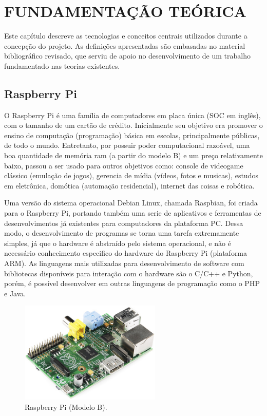 
\chapter{FUNDAMENTAÇÃO TEÓRICA}
\label{chap:fundamentacao-teorica}

Este capítulo descreve as tecnologias e conceitos centrais utilizados durante a
concepção do projeto. As definições apresentadas são embasadas no material bibliográfico
revisado, que serviu de apoio no desenvolvimento de um trabalho fundamentado nas teorias
existentes.

\section{Raspberry Pi}
\label{sec:raspi}

O Raspberry Pi é uma família de computadores em placa única (SOC em inglês), com o tamanho de um cartão de crédito. Inicialmente seu objetivo era promover o ensino de computação (programação) básica em escolas, principalmente públicas, de todo o mundo. Entretanto, por possuir poder computacional razoável, uma boa quantidade de memória ram (a partir do modelo B) e um preço relativamente baixo, passou a ser usado para outros objetivos como: console de videogame clássico (emulação de jogos), gerencia de mídia (vídeos, fotos e musicas), estudos em eletrônica, domótica (automação residencial), internet das coisas e robótica.  \par
Uma versão do sistema operacional Debian Linux, chamada Raspbian, foi criada para o Raspberry Pi, portando também uma serie de aplicativos e ferramentas de desenvolvimentos já existentes para computadores da plataforma PC. Dessa modo, o desenvolvimento de programas se torna uma tarefa extremamente simples, já que o hardware é abstraído pelo sistema operacional, e não é necessário conhecimento especifico do hardware do Raspberry Pi (plataforma ARM). As linguagens mais utilizadas para desenvolvimento de software com bibliotecas disponíveis para interação com o hardware são o C/C++ e Python, porém, é possível desenvolver em outras linguagens de programação como o PHP e Java.  \par

\begin{figure}[H]
	\centering
	\includegraphics[width=0.6\textwidth]{figuras/raspberrypi_model_b.jpg}
	\caption{Raspberry Pi (Modelo B).}
	\label{fig:raspi_modelb}
\end{figure}

